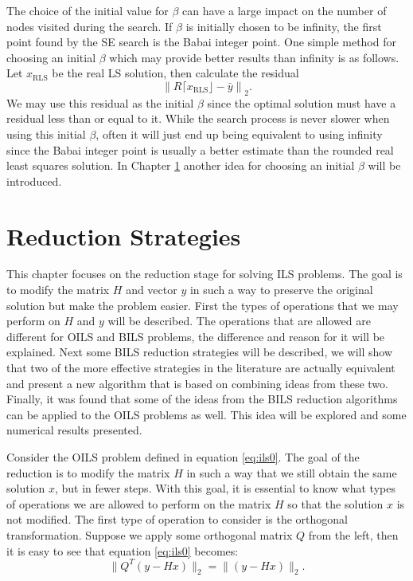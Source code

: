 \documentclass[12pt,Bold,letterpaper]{mcgilletdclass}
\begin{document}
The choice of the initial value for $\beta$ can have a large impact on the number of nodes visited during the search. If $\beta$ is initially chosen to be infinity, the first point found by the SE search is the Babai integer point. One simple method for choosing an initial $\beta$ which may provide better results than infinity is as follows. Let $x_{\scriptscriptstyle{\mathrm{RLS}}}$ be the real LS solution, then calculate the residual $$\left \| R \lceil x_{\scriptscriptstyle{\mathrm{RLS}}} \rfloor - \bar{y} \right \|_2.$$ We may use this residual as the initial $\beta$ since the optimal solution must have a residual less than or equal to it. While the search process is never slower when using this initial $\beta$, often it will just end up being equivalent to using infinity since the Babai integer point is usually a better estimate than the rounded real least squares solution. In Chapter \ref{chap:Reduction} another idea for choosing an initial $\beta$ will be introduced.

\chapter{Reduction Strategies} \label{chap:Reduction}

This chapter focuses on the reduction stage for solving ILS problems. The goal is to modify the matrix $H$ and vector $y$ in such a way to preserve the original solution but make the problem easier. First the types of operations that we may perform on $H$ and $y$ will be described. The operations that are allowed are different for OILS and BILS problems, the difference and reason for it will be explained. Next some BILS reduction strategies will be described, we will show that two of the more effective strategies in the literature are actually equivalent and present a new algorithm that is based on combining ideas from these two. Finally, it was found that some of the ideas from the BILS reduction algorithms can be applied to the OILS problems as well. This idea will be explored and some numerical results presented.

Consider the OILS problem defined in equation \eqref{eq:ils0}. The goal of the reduction is to modify the matrix $H$ in such a way that we still obtain the same solution $x$, but in fewer steps. With this goal, it is essential to know what types of operations we are allowed to perform on the matrix $H$ so that the solution $x$ is not modified. The first type of operation to consider is the orthogonal transformation. Suppose we apply some orthogonal matrix $Q$ from the left, then it is easy to see that equation \eqref{eq:ils0} becomes: $$ \| Q^T(y- Hx)\|_2 = \| (y- Hx) \|_2.$$ 
\end{document}
